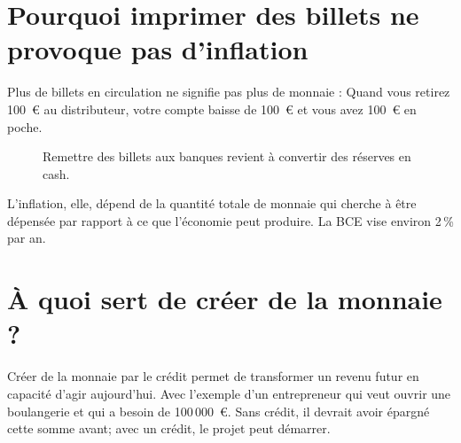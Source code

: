\documentclass[11pt,a4paper]{article}
\begin{document}
\section{Pourquoi imprimer des billets ne provoque pas d'inflation}

Plus de billets en circulation ne signifie pas plus de monnaie :  Quand vous retirez 100~\euro{} au distributeur, votre compte baisse de 100~\euro{} et vous avez 100~\euro{} en poche. 

\begin{figure}[htbp]
\centering
{}
\caption{Remettre des billets aux banques revient à convertir des réserves en cash.}
\label{fig:billets}
\end{figure}

 L'inflation, elle, dépend de la quantité totale de monnaie qui cherche à être dépensée par rapport à ce que l'économie peut produire. La BCE vise environ 2\,\% par an.
\section{À quoi sert de créer de la monnaie ?}

Créer de la monnaie par le crédit permet de transformer un revenu futur en capacité d'agir aujourd'hui. Avec l'exemple d'un entrepreneur qui veut ouvrir une boulangerie et qui a besoin de 100\,000~\euro. Sans crédit, il devrait avoir épargné cette somme avant; avec un crédit, le projet peut démarrer.
\end{document}
